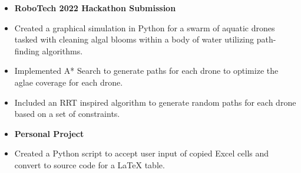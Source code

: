 \documentclass[10pt,a4paper,ragged2e,withhyper]{altacv}
\begin{document}
\begin{paracol}{2}
    \begin{itemize}
        \item[] \textbf{RoboTech 2022 Hackathon Submission}
        \item Created a graphical simulation in Python for a swarm of aquatic drones tasked with cleaning algal blooms within a body of water utilizing path-finding algorithms.
        \item Implemented A* Search to generate paths for each drone to optimize the aglae coverage for each drone.
        \item Included an RRT inspired algorithm to generate random paths for each drone based on a set of constraints.
    \end{itemize}

    \begin{itemize}
        \item[] \textbf{Personal Project}
        \item Created a Python script to accept user input of copied Excel cells and convert to source code for a LaTeX table.
    \end{itemize}




\end{paracol}
\end{document}
